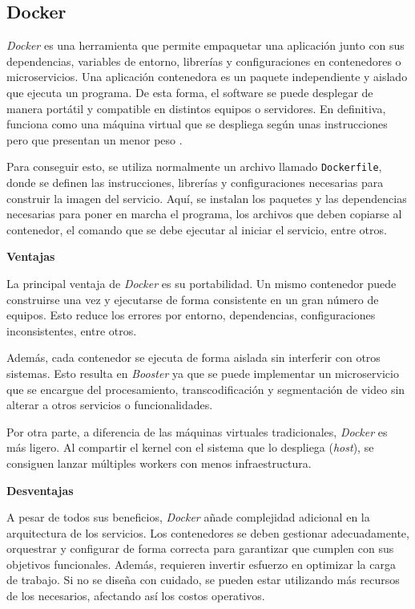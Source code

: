 \subsection{Docker}

\textit{Docker} es una herramienta que permite empaquetar una aplicación junto con sus dependencias, variables de entorno, librerías y configuraciones en contenedores o microservicios. Una aplicación contenedora es un paquete independiente y aislado que ejecuta un programa. De esta forma, el software se puede desplegar de manera portátil y compatible en distintos equipos o servidores. En definitiva, funciona como una máquina virtual que se despliega según unas instrucciones pero que presentan un menor peso \cite{docker-ibm}. 

Para conseguir esto, se utiliza normalmente un archivo llamado \texttt{Dockerfile}, donde se definen las instrucciones, librerías y configuraciones necesarias para construir la imagen del servicio. Aquí, se instalan los paquetes y las dependencias necesarias para poner en marcha el programa, los archivos que deben copiarse al contenedor, el comando que se debe ejecutar al iniciar el servicio, entre otros.  

\textbf{Ventajas}

La principal ventaja de \textit{Docker} es su portabilidad. Un mismo contenedor puede construirse una vez y ejecutarse de forma consistente en un gran número de equipos. Esto reduce los errores por entorno, dependencias, configuraciones inconsistentes, entre otros.

Además, cada contenedor se ejecuta de forma aislada sin interferir con otros sistemas. Esto resulta en \textit{Booster} ya que se puede implementar un microservicio que se encargue del procesamiento, transcodificación y segmentación de video sin alterar a otros servicios o funcionalidades. 

Por otra parte, a diferencia de las máquinas virtuales tradicionales, \textit{Docker} es más ligero. Al compartir el kernel con el sistema que lo despliega (\textit{host}), se consiguen lanzar múltiples workers con menos infraestructura. 

\textbf{Desventajas}

A pesar de todos sus beneficios, \textit{Docker} añade complejidad adicional en la arquitectura de los servicios. Los contenedores se deben gestionar adecuadamente, orquestrar y configurar de forma correcta para garantizar que cumplen con sus objetivos funcionales. Además, requieren invertir esfuerzo en optimizar la carga de trabajo. Si no se diseña con cuidado, se pueden estar utilizando más recursos de los necesarios, afectando así los costos operativos. 

